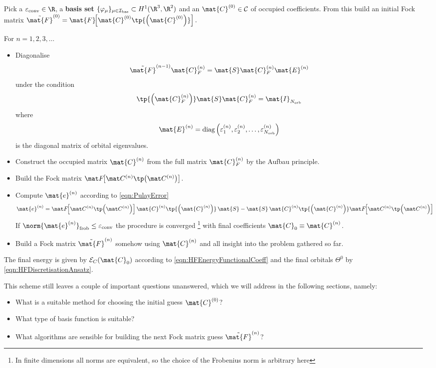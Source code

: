 \begin{rem}
	\label{rem:SCFcoeff}
	Pick a  $\epsilonconv \in \R$,
	a \textbf{basis set} $\{\varphi_\mu\}_{\mu\in\Ibas} \subset H^1(\R^3, \R^2)$
	and an  $\mat{C}^{(0)} \in \mathcal{C}$
	of occupied coefficients.
	From this build an initial Fock matrix
	$\tilde{\mat{F}}^{(0)} = \mat{F}\!\!\left[\mat{C}^{(0)} \tp{\left(\mat{C}^{(0)}\right)}\right].$

	\noindent
	For $n=1,2,3,\ldots$
	\begin{itemize}
		\item Diagonalise
			\[ \tilde{\mat{F}}^{(n-1)} \mat{C}_F^{(n)} = \mat{S} \mat{C}_F^{(n)} \mat{E}^{(n)} \]
			under the condition
			\[ \tp{\left(\mat{C}_F^{(n)}\right)} \mat{S}  \mat{C}_F^{(n)} = \mat{I}_{\Norb} \]
			where
			\[
				\mat{E}^{(n)}
				= \text{diag}\left(\varepsilon_1^{(n)},
				\varepsilon_2^{(n)}, \ldots,
				\varepsilon_{\Norb}^{(n)}\right)
			\]
			is the diagonal matrix of orbital eigenvalues.
		\item Construct the occupied matrix $\mat{C}^{(n)}$
			from the full matrix $\mat{C}_F^{(n)}$ by the Aufbau principle.
		\item Build the Fock matrix $\matFnfull$.
		\item Compute $\mat{e}^{(n)}$ according to \eqref{eqn:PulayError}
			\[
			\mat{e}^{(n)}
			= \matFnfull \mat{C}^{(n)} \tp{\left(\mat{C}^{(n)}\right)} \, \mat{S}
			- \mat{S} \, \mat{C}^{(n)} \tp{\left(\mat{C}^{(n)}\right)} \matFnfull
			\]
			If $\norm{ \mat{e}^{(n)} }_\text{frob} \leq  \epsilonconv$
			the procedure is converged%
			\footnote{In finite dimensions all norms are equivalent,
				so the choice of the Frobenius norm is arbitrary here}
			with final coefficients $\mat{C}_0 \equiv \mat{C}^{(n)}$.
		\item Build a Fock matrix $\tilde{\mat{F}}^{(n)}$ somehow
			using $\mat{C}^{(n)}$ and all insight into the problem gathered so far.
	\end{itemize}
	The final \HF energy is given by $\mathcal{E}_C(\mat{C}_0)$
	according to \eqref{eqn:HFEnergyFunctionalCoeff} and the final
	\SCF orbitals $\Theta^0$ by \eqref{eqn:HFDiscretisationAnsatz}.
\end{rem}
This scheme still leaves a couple of important questions unanswered,
which we will address in the following sections, namely:
\begin{itemize}
	\item What is a suitable method for choosing the initial guess $\mat{C}^{(0)}$?
	\item What type of basis function is suitable?
	\item What algorithms are sensible for building the next
		Fock matrix guess $\tilde{\mat{F}}^{(n)}$?
\end{itemize}

